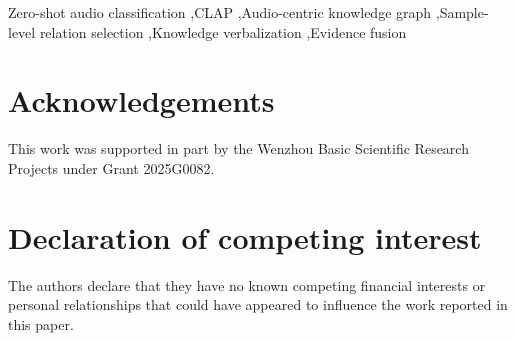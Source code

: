 \documentclass[final,5p,times,twocolumn]{elsarticle}
\providecommand{\methodrevision}[1]{#1}
\begin{document}
\begin{frontmatter}
\begin{abstract}
\begin{CJK*}{UTF8}{gbsn}
零样本音频分类通过匹配音频与自然语言类别描述，使预训练模型无需针对目标任务重新训练即可识别声音。然而，简短的类别名称难以充分表达声音事件的来源、场景及语义联系，限制了音频--文本匹配所能利用的信息。知识图谱能够补充这些语义联系，但如何选择适合当前音频的知识、准确表达关系语义并协调其对分类决策的影响，仍是知识增强中的关键问题。为此，本文提出样本自适应知识整合框架（Sample-Adaptive Knowledge Integration，SAKI），在保持对比语言--音频预训练模型（CLAP）参数不变的条件下，利用结构化知识改善候选类别排序。该框架通过音频对齐知识语言化模块（Audio-Aligned Knowledge Verbalization，AAKV），利用声音导向指令和实体--关系约束，引导大语言模型将三元组转换为自然语言证据；在此基础上，将不同关系下的知识增强预测构建为关系专家，结合预测共识与分类间隔，无需测试标签即可选择适合当前音频的关系；随后，在类别内部聚合所选知识证据，并与原始CLAP分数进行分层融合。\methodrevision{在五个公开音频数据集上，SAKI相较于本文复现的iKnow-audio，Hit@1提高了2.08--12.73个百分点，MRR提高了1.02--6.68个百分点。}本文将类别关联的结构化知识转化为面向当前音频的判别证据，为缓解类别描述的语义不足、实现样本自适应的知识增强提供了统一框架。
\end{CJK*}
\end{abstract}

\begin{keyword}
Zero-shot audio classification \sep CLAP \sep Audio-centric knowledge graph \sep Sample-level relation selection \sep Knowledge verbalization \sep Evidence fusion
\end{keyword}

\end{frontmatter}








\section*{Acknowledgements}
This work was supported in part by the Wenzhou Basic Scientific Research Projects under Grant 2025G0082.

\section*{Declaration of competing interest}
The authors declare that they have no known competing financial interests or personal relationships that could have appeared to influence the work reported in this paper.
\end{document}
